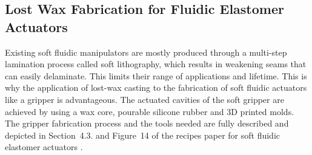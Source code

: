 \subsection{Lost Wax Fabrication for Fluidic Elastomer Actuators}
Existing soft fluidic manipulators are mostly produced through a multi-step lamination process called soft lithography, which results in weakening seams that can easily delaminate. 
This limits their range of applications and lifetime.
This is why the application of lost-wax casting to the fabrication of soft fluidic actuators like a gripper is advantageous.
The actuated cavities of the soft gripper are achieved by using a wax core, pourable silicone rubber and 3D printed molds.
The gripper fabrication process and the tools needed are fully described and depicted in Section~4.3. and Figure~14 of the recipes paper for soft fluidic elastomer actuators \cite{marchese2015recipe}. %
%
